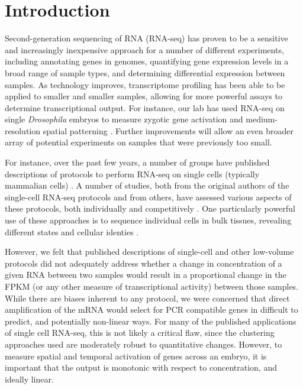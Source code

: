 \section{Introduction}
Second-generation sequencing of RNA (RNA-seq) has proven to be a sensitive and increasingly inexpensive approach for a number of different experiments, including annotating genes in genomes, quantifying gene expression levels in a broad range of sample types, and determining differential expression between samples.  As technology improves, transcriptome profiling has been able to be applied to smaller and smaller samples, allowing for more powerful assays to determine transcriptional output.  For instance, our lab has used RNA-seq on single {\em Drosophila} embryos to measure zygotic gene activation \cite{Lott:2011cc} and medium-resolution spatial patterning \cite{Combs:2013jy}.  Further improvements will allow an even broader array of potential experiments on samples that were previously too small.

For instance, over the past few years, a number of groups have published descriptions of protocols to perform RNA-seq on single cells (typically mammalian cells) \cite{Tang:2009kj,Ramskold:2012gj,Sasagawa:2013jx,Hashimshony:2012ca,Islam:2011jr}. A number of studies, both from the original authors of the single-cell RNA-seq protocols and from others, have assessed various aspects of these protocols, both individually and competitively \cite{Bhargava:2014gf,Wu:2014eg,Marinov:2013fm}. One particularly powerful use of these approaches is to sequence individual cells in bulk tissues, revealing different states and cellular identies \cite{Buganim:2012hp,Treutlein:2014ec}.

However, we felt that published descriptions of single-cell and other low-volume protocols did not adequately address whether a change in concentration of a given RNA between two samples would result in a proportional change in the FPKM (or any other measure of transcriptional activity) between those samples. While there are biases inherent to any protocol, we were concerned that direct amplification of the mRNA would select for PCR compatible genes in difficult to predict, and potentially non-linear ways.  For many of the published applications of single cell RNA-seq, this is not likely a critical flaw, since the clustering approaches used are moderately robust to quantitative changes.  However, to measure spatial and temporal activation of genes across an embryo, it is important that the output is monotonic with respect to concentration, and ideally linear.




